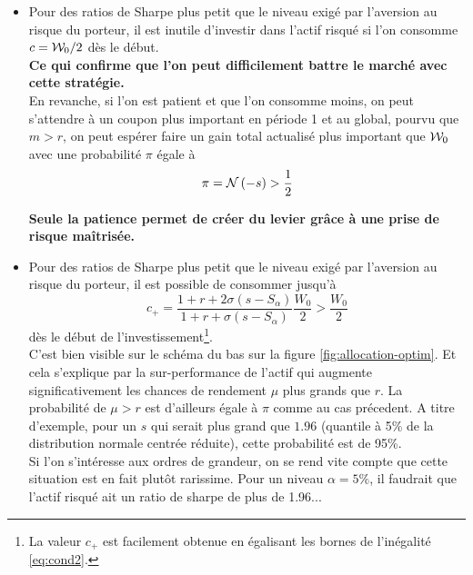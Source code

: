 \documentclass{article}
\numberwithin{equation}{section}
\begin{document}
\begin{itemize}
\item Pour des ratios de Sharpe plus petit que le niveau exigé par l'aversion au risque du porteur, il est inutile d'investir dans l'actif risqué si l'on consomme $c = \mathcal{W}_0/2$ dès le début.\\

\textbf{\color{awesomePurple}Ce qui confirme que l'on peut difficilement battre le marché avec cette stratégie.}\\

En revanche, si l'on est patient et que l'on consomme moins, on peut s'attendre à un coupon plus important en période 1 et au global, pourvu que $m>r$, on peut espérer faire un gain total actualisé plus important que $\mathcal{W}_0$ avec une probabilité $\pi$ égale à
\begin{equation}
\pi = \mathcal{N}\left( -s \right) > \frac{1}{2}
\end{equation}

\textbf{\color{awesomePurple}Seule la patience permet de créer du levier grâce à une prise de risque maîtrisée.}\\

\item Pour des ratios de Sharpe plus petit que le niveau exigé par l'aversion au risque du porteur, il est possible de consommer jusqu'à 
\begin{equation}
c_+ = \frac{1 + r + 2\sigma\left( s - S_\alpha \right)}{1 + r + \sigma\left( s - S_\alpha \right)}\frac{W_0}{2}> \frac{W_0}{2}
\end{equation}
dès le début de l'investissement\footnote{La valeur $c_+$ est facilement obtenue en égalisant les bornes de l'inégalité \eqref{eq:cond2}.}.\\

C'est bien visible sur le schéma du bas sur la figure \ref{fig:allocation-optim}. Et cela s'explique par la sur-performance de l'actif qui augmente significativement les chances de rendement $\mu$ plus grands que $r$. La probabilité de $\mu>r$ est d'ailleurs égale à $\pi$ comme au cas précedent. A titre d'exemple, pour un $s$ qui serait plus grand que $1.96$ (quantile à 5\% de la distribution normale centrée réduite), cette probabilité est de 95\%.\\

Si l'on s'intéresse aux ordres de grandeur, on se rend vite compte que cette situation est en fait plutôt rarissime. Pour un niveau $\alpha = 5\%$, il faudrait que l'actif risqué ait un ratio de sharpe de plus de 1.96...\\

\end{itemize}
\end{document}
